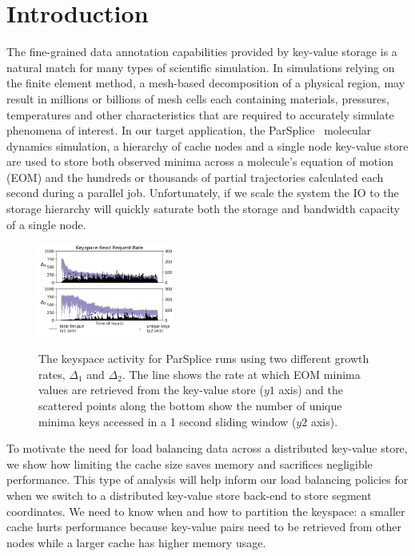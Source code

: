 \section{Introduction}
\label{sec:introduction}

The fine-grained data annotation capabilities provided by key-value storage is
a natural match for many types of scientific simulation. In simulations relying
on the finite element method, a mesh-based decomposition of a physical region,
may result in millions or billions of mesh cells each containing materials,
pressures, temperatures and other characteristics that are required to
accurately simulate phenomena of interest. In our target application, the
ParSplice~\cite{perez:jctc20150parsplice} molecular dynamics simulation, a
hierarchy of cache nodes and a single node key-value store are used to store
both observed minima across a molecule's equation of motion (EOM) and the
hundreds or thousands of partial trajectories calculated each second during a
parallel job. Unfortunately, if we scale the system the IO to the storage
hierarchy will quickly saturate both the storage and bandwidth capacity of a
single node. 

\begin{figure}[t]
  \noindent\includegraphics[width=0.4\textwidth]{figures/motivation-regimes.png}\\
  \caption{The keyspace activity for ParSplice runs using two different growth
  rates, \(\Delta_1\) and \(\Delta_2\).  The line shows the rate at which EOM
  minima values are retrieved from the key-value store (\(y1\) axis) and the
  scattered points along the bottom show the number of unique minima keys
  accessed in a 1 second sliding window (\(y2\) axis).
  \label{fig:motivation-regimes}}
\end{figure}

To motivate the need for load balancing data across a distributed key-value store,
we show how limiting the cache size saves memory and sacrifices negligible
performance. This type of analysis will help inform our load balancing policies
for when we switch to a distributed key-value store back-end to store segment
coordinates.  We need to know when and how to partition the keyspace: a smaller
cache hurts performance because key-value pairs need to be retrieved from other
nodes while a larger cache has higher memory usage. 

